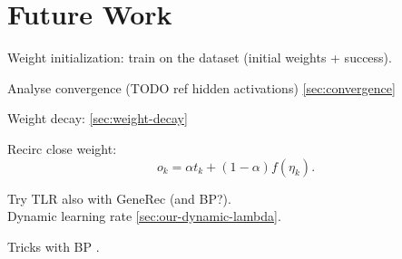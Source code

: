
\section*{Future Work} 
Weight initialization: train on the dataset (initial weights + success). 

Analyse convergence 
(TODO ref hidden activations) \ref{sec:convergence} 

Weight decay: 
\ref{sec:weight-decay} 

Recirc close weight: 
\begin{equation}
o_k = \alpha t_k + (1-\alpha)f(\eta_k). 
\end{equation} 

Try TLR also with GeneRec (and BP?).  \\ 


Dynamic learning rate \ref{sec:our-dynamic-lambda}. 

Tricks with BP \citep{lecun2012efficient}. 
